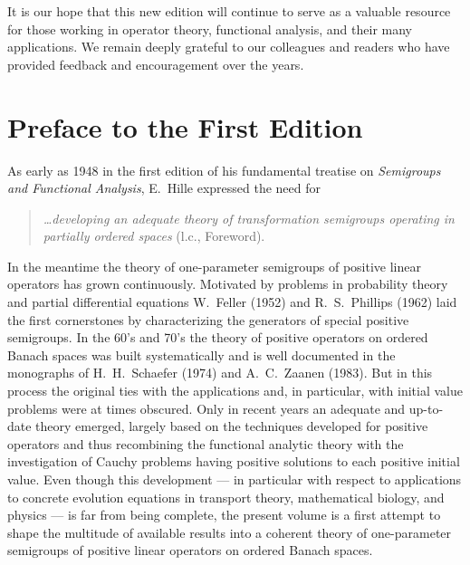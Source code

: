 	It is our hope that this new edition will continue to serve as a valuable resource for those working in operator theory, functional analysis, and their many applications. 
	We remain deeply grateful to our colleagues and readers who have provided feedback and encouragement over the years.



\section*{Preface to the First Edition}

As early as 1948 in the first edition of his fundamental treatise on \emph{Semigroups and Functional Analysis}, E.~Hille expressed the need for 

\begin{quote}
\textit{\ldots developing an adequate theory of transformation semigroups operating in partially ordered spaces} (l.c., Foreword). 
\end{quote}

In the meantime the theory of one-parameter semigroups of positive linear operators has grown continuously. 
Motivated by problems in probability theory and partial differential equations W.~Feller (1952) and R.~S.~Phillips (1962) laid the first cornerstones by characterizing the generators of special positive semigroups. 
In the 60's and 70's the theory of positive operators on ordered Banach spaces was built systematically and is well documented in the monographs of H.~H.~Schaefer (1974) and A.~C.~Zaanen (1983). 
But in this process the original ties with the applications and, in particular, with initial value problems were at times obscured. 
Only in recent years an adequate and up-to-date theory emerged, largely based on the techniques developed for positive operators and thus recombining the functional analytic theory with the investigation of Cauchy problems having positive solutions to each positive initial value. 
Even though this development --- in particular with respect to applications to concrete evolution equations in transport theory, mathematical biology, and physics --- is far from being complete, the present volume is a first attempt to shape the multitude of available results into a coherent theory of one-parameter semigroups of positive linear operators on ordered Banach spaces.

